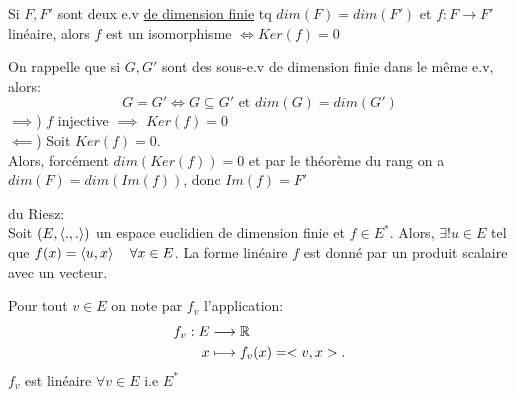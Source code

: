 \begin{prop}
    Si $F, F'$ sont deux e.v \underline{de dimension finie} tq $dim(F) = dim(F')$ et  $f: F \to F'$ linéaire, alors $f$ est un isomorphisme $\iff Ker(f) = {0}$
\end{prop}
\begin{explanation}
   On rappelle que si $G, G'$ sont des sous-e.v de dimension finie dans le même e.v, alors:
   \[
   G = G' \iff G \subseteq G' \text{ et } dim(G) = dim(G')
   \] 
   $\implies$) $f$ injective  $\implies$ $Ker(f) = {0}$\\
   $\impliedby$) Soit $Ker(f) = {0}$.\\
   Alors, forcément  $dim(Ker(f)) = 0$ et par le théorème du rang on a  $dim(F) = dim(Im(f))$, donc  $Im(f) = F'$
\end{explanation}
\begin{lemma} du Riesz:\\
    Soit $(E, \left\langle .,. \right\rangle)$ un espace euclidien de  dimension finie et $f \in E^*$. Alors, $\exists! u \in E$ tel que $f(x) = \left\langle u, x \right\rangle \quad \forall x \in E$. La forme linéaire $f$ est donné par un produit scalaire avec un vecteur. 
\end{lemma}
\begin{notation}
   Pour tout $v \in E$ on note par  $f_v$ l'application:
   \begin{align*}
       f_v: E &\longrightarrow \mathbb{R} \\
       x &\longmapsto f_v(x) = <v, x>
   .\end{align*}
   $f_v$ est linéaire  $\forall v \in E$ i.e $E^*$
\end{notation}

